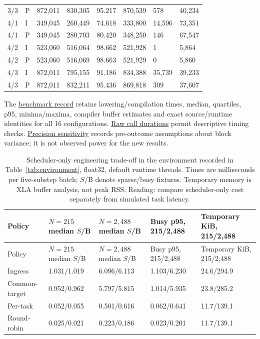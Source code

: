\documentclass[12pt,a4paper]{article}
\begin{document}
\begin{xltabular}{\textwidth}{@{}YYYYYYYY@{}}
3/3 & P & 872,011 & 830,305 & 95.217 & 870,539 & 578 & 40,234 \\
4/1 & I & 349,045 & 260,449 & 74.618 & 333,800 & 14,596 & 73,351 \\
4/1 & P & 349,045 & 280,703 & 80.420 & 348,250 & 146 & 67,547 \\
4/2 & I & 523,060 & 516,064 & 98.662 & 521,928 & 1 & 5,864 \\
4/2 & P & 523,060 & 516,069 & 98.663 & 521,929 & 0 & 5,860 \\
4/3 & I & 872,011 & 795,155 & 91.186 & 834,388 & 35,739 & 39,233 \\
4/3 & P & 872,011 & 832,211 & 95.436 & 869,818 & 309 & 37,607 \\
\end{xltabular}
\endgroup

The \href{\detokenize{../empirical_extension_2026-09-08/analysis/results/BENCHMARK.json}}{benchmark record} retains lowering/compilation times, median, quartiles, p95, minima/maxima, compiler buffer estimates and exact source/runtime identities for all 16 configurations. \href{\detokenize{../empirical_extension_2026-09-08/analysis/results/BENCHMARK_TIMES.csv}}{Raw call durations} permit descriptive timing checks. \href{\detokenize{../empirical_extension_2026-09-08/confirmation/PRECISION.json}}{Precision sensitivity} records pre-outcome assumptions about block variance; it is not observed power for the new results.

\begingroup
\singlespacing\footnotesize\setlength{\tabcolsep}{3pt}
\renewcommand{\thetable}{D2}
\begin{xltabular}{\textwidth}{@{}YYYYY@{}}
\caption[Scheduler-only engineering trade-offs]{Scheduler-only engineering trade-off in the environment recorded in Table~\ref{tab:environment}, float32, default runtime threads. Times are milliseconds per five-substep batch; $S$/B denote sparse/busy fixtures. Temporary memory is XLA buffer analysis, not peak RSS. Reading: compare scheduler-only cost separately from simulated task latency.}\label{tab:D2} \\
\toprule
Policy & $N=215$ median $S$/B & $N=2{,}488$ median $S$/B & Busy p95, 215/2,488 & Temporary KiB, 215/2,488 \\
\midrule\endfirsthead
\toprule
Policy & $N=215$ median $S$/B & $N=2{,}488$ median $S$/B & Busy p95, 215/2,488 & Temporary KiB, 215/2,488 \\
\midrule\endhead
\bottomrule\endfoot
Ingress & 1.031/1.019 & 6.096/6.113 & 1.103/6.230 & 24.6/294.9 \\
Common-target & 0.952/0.962 & 5.797/5.815 & 1.014/5.935 & 23.8/285.2 \\
Per-task & 0.052/0.055 & 0.501/0.616 & 0.062/0.641 & 11.7/139.1 \\
Round-robin & 0.025/0.021 & 0.223/0.186 & 0.023/0.201 & 11.7/139.1 \\
\end{xltabular}
\endgroup
\end{document}
